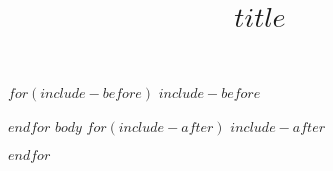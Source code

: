\documentclass[$layout$]{ametsoc}
\title{$title$}
\affiliation{$affiliation$}
\begin{document}
\maketitle
$for(include-before)$
$include-before$

$endfor$
$body$
$for(include-after)$
$include-after$

$endfor$
\end{document}
